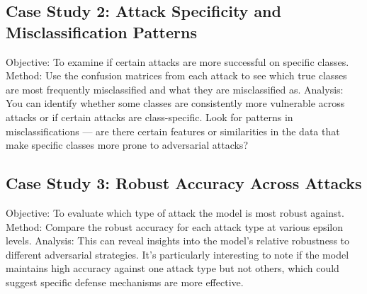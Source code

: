 \documentclass[10pt, conference, a4paper, final]{IEEEtran}
\begin{document}
\subsection{Case Study 2: Attack Specificity and Misclassification Patterns}
Objective: To examine if certain attacks are more successful on specific classes.
Method: Use the confusion matrices from each attack to see which true classes are most frequently misclassified and what they are misclassified as.
Analysis: You can identify whether some classes are consistently more vulnerable across attacks or if certain attacks are class-specific. Look for patterns in misclassifications — are there certain features or similarities in the data that make specific classes more prone to adversarial attacks?
\subsection{Case Study 3: Robust Accuracy Across Attacks}
Objective: To evaluate which type of attack the model is most robust against.
Method: Compare the robust accuracy for each attack type at various epsilon levels.
Analysis: This can reveal insights into the model’s relative robustness to different adversarial strategies. It’s particularly interesting to note if the model maintains high accuracy against one attack type but not others, which could suggest specific defense mechanisms are more effective.
\end{document}
